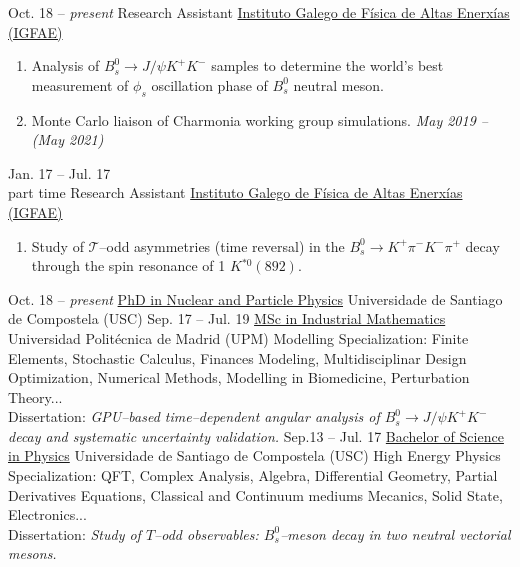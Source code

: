 \documentclass[9pt]{resumetemplate}
\begin{document}
\begin{entrylist}
  \entry
		{Oct. 18 -- \emph{present}}
		{Research Assistant}
		{\href{https://igfae.usc.es/igfae/}{Instituto Galego de Física de Altas Enerxías (IGFAE)}}
    {%
		\vspace{-3mm}
    \begin{enumerate}
      \item Analysis of $B_s^0 \rightarrow J\!/\psi K^+ K^-$ samples to
			determine the world's best measurement of $\phi_s$ oscillation phase of 
			$B_{s}^0$ neutral meson.
			\item Monte Carlo liaison of Charmonia working group simulations. \hfill
			\emph{May 2019 -- (May 2021)}
    \end{enumerate}
    }
  \entry
    {Jan. 17 -- Jul. 17\\\footnotesize{part time}}
    {Research Assistant}
    {\href{https://igfae.usc.es/igfae/}{Instituto Galego de Física de Altas Enerxías (IGFAE)}}
    {%
		\vspace{-3mm}
    \begin{enumerate}
      \item Study of $\mathcal{T}$--odd asymmetries (time reversal) in the
			$B_s^0 \rightarrow K^+ \pi^- K^- \pi^+$ decay through the spin resonance
			of 1 $K{}^{*0}(892)$.
    \end{enumerate}
    }
\end{entrylist}


\begin{entrylist}
	\entry
		{Oct. 18 -- \emph{present}}
		{\href{https://igfae.usc.es/igfae/es/doctorado/}{PhD in Nuclear and Particle
		Physics}}
		{Universidade de Santiago de Compostela (USC)}
		{}
	\entry
		{Sep. 17 -- Jul. 19}
		{\href{http://m2i.es/en/}{MSc in Industrial Mathematics}}
		{Universidad Politécnica de Madrid (UPM)}
		{Modelling Specialization: Finite Elements, Stochastic Calculus,
		Finances Modeling, Multidisciplinar Design Optimization, Numerical Methods,
		Modelling in Biomedicine, Perturbation Theory... \\
		Dissertation: \emph{GPU--based time--dependent
		angular analysis of $B_s^0 \rightarrow J/\psi K^+K^-$ decay and systematic
		uncertainty validation.}}
	\entry
		{Sep.13 -- Jul. 17}
		{\href{https://www.usc.es/es/centros/fisica/}{Bachelor of Science in
		Physics}}
		{Universidade de Santiago de Compostela (USC)}
		{High Energy Physics Specialization: QFT, Complex Analysis, Algebra, 
		Differential Geometry, Partial Derivatives Equations, Classical and 
		Continuum mediums Mecanics, Solid State, Electronics...\\
		Dissertation: \emph{Study of $T$--odd observables: $B_s^0$--meson decay in
		two neutral vectorial mesons.}}
\end{entrylist}
\end{document}
